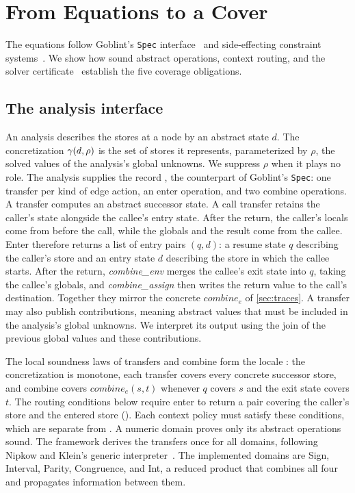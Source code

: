 \section{From Equations to a Cover}
\label{sec:equations}

The equations follow Goblint's \texttt{Spec} interface~\cite{vojdani16,seidl26}
and side-effecting constraint systems~\cite{seidl03,apinis12}. We show how
sound abstract operations, context routing, and the solver
certificate~\cite{tilscher26} establish the five coverage obligations.

\subsection{The analysis interface}

An analysis describes the stores at a node by an abstract state $d$. The
concretization $\gamma(d, \rho)$ is the set of stores it represents,
parameterized by $\rho$, the solved values of the analysis's global unknowns.
We suppress $\rho$ when it plays no role. The
analysis supplies the record , the counterpart of Goblint's
\texttt{Spec}: one transfer per kind of edge action, an enter operation, and
two combine operations. A transfer computes an abstract successor state. A call transfer retains the caller's state alongside
the callee's entry state. After the return, the
caller's locals come from before the call, while the globals and the result
come from the callee. Enter therefore returns a list of entry pairs $(q, d)$:
a resume state $q$ describing the caller's store and an entry state $d$
describing the store in which the callee starts. After the return,
\emph{combine\_env} merges the callee's exit state into $q$, taking the
callee's globals, and \emph{combine\_assign} then writes the return value to
the call's destination. Together they mirror the concrete
$\mathit{combine}_e$ of \cref{sec:traces}. A transfer may also publish
contributions, meaning abstract values that must be included in
the analysis's global unknowns. We interpret its output using the join of the
previous global values and these contributions.

The local soundness laws of transfers and combine form the locale
: the concretization is monotone, each transfer
covers every concrete successor store, and combine covers $\mathit{combine}_e(s, t)$
whenever $q$ covers $s$ and the exit state covers $t$. The routing conditions
below require enter to return a pair
covering the caller's store and the entered store
(). Each context policy must satisfy these
conditions, which are separate from . A numeric
domain proves only its abstract operations sound. The framework derives the
transfers once for all domains, following Nipkow and Klein's generic
interpreter~\cite[Sect.~13.5]{nipkow14}. The implemented domains are Sign,
Interval, Parity, Congruence, and Int, a reduced product that combines all four
and propagates information between them.

